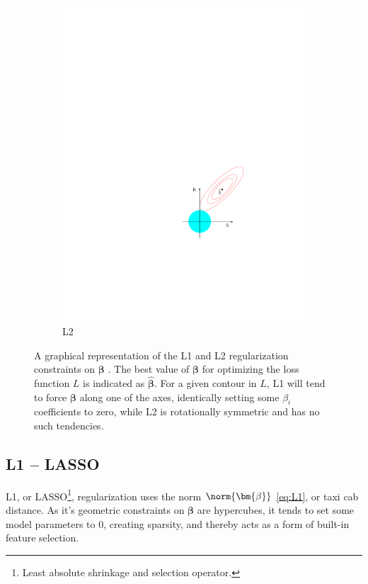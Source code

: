 \begin{figure}[H]
\begin{subfigure}[b]{0.48\textwidth}
      \includegraphics[width=\textwidth]{figures/ml/l2}
  \caption{L2}
  \label{fig:ml:l1l2:L2}
  \end{subfigure}
\caption{
A graphical representation of the L1 and L2 regularization constraints on $\bm{\beta}$ \cite{HastieTF09}.
The best value of $\bm{\beta}$ for optimizing the loss function $L$ is indicated as $\hat{\bm{\beta}}$.
For a given contour in $L$, L1 will tend to force $\bm{\beta}$ along one of the axes,
identically setting some $\beta_{i}$ coefficients to zero,
while L2 is rotationally symmetric and has no such tendencies.
\label{fig:ml:l1l2}
}
\end{figure}

\subsection{L1 -- LASSO}
\label{ml:general:reg:L1}
L1, or LASSO\footnote{Least absolute shrinkage and selection operator.},
regularization uses the norm $\norm{\bm{\beta}}$ \cref{eq:L1}, or taxi cab distance.
As it's geometric constraints on $\bm{\beta}$ are hypercubes,
it tends to set some model parameters to 0, creating sparsity,
and thereby acts as a form of built-in feature selection.

